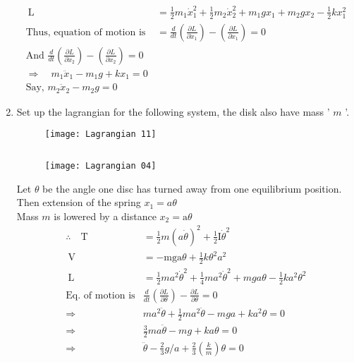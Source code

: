 \begin{enumerate}
\begin{answer}
\begin{align*}
	\mathrm{~L}&=\frac{1}{2} m_{1} \dot{x}_{1}^{2}+\frac{1}{2} m_{2} \dot{x}_{2}^{2}+m_{1} g x_{1}+m_{2} g x_{2}-\frac{1}{2} k x_{1}^{2}\\
	\text{Thus, equation of motion is }&=\frac{d}{d t}\left(\frac{\partial L}{\partial \dot{x}_{1}}\right)-\left(\frac{\partial L}{\partial x_{1}}\right)=0\\
	\text{And }\frac{d}{d t}\left(\frac{\partial L}{\partial \dot{x}_{2}}\right)-\left(\frac{\partial L}{\partial x_{2}}\right)=0\\
	\Rightarrow \quad m_{1} \ddot{x}_{1}-m_{1} g+k x_{1}=0\\
	\text{Say, }m_{2} \ddot{x}_{2}-m_{2} g=0
	\end{align*}
\end{answer}
\item Set up the lagrangian for the following system, the disk also have mass ' $m$ '.
\begin{figure}[H]
	\centering
	\texttt{[image: Lagrangian 11]}
\end{figure}
\begin{answer}$\left. \right. $
	\begin{figure}[H]
		\centering
		\texttt{[image: Lagrangian 04]}
	\end{figure}
		Let $\theta$ be the angle one disc has turned away from one equilibrium position. Then extension of the spring $x_{1}=a \theta$\\
	Mass $m$ is lowered by a distance $x_{2}=\mathrm{a} \theta$
	\begin{align*}
\therefore \quad \mathrm{T} &=\frac{1}{2} m(a \dot{\theta})^{2}+\frac{1}{2} \mathrm{I} \dot{\theta}^{2} \\ \mathrm{~V} &=-\mathrm{mga} \theta+\frac{1}{2} k \theta^{2} a^{2} \\ \mathrm{~L} &=\frac{1}{2} m a^{2} \dot{\theta}^{2}+\frac{1}{4} m a^{2} \dot{\theta}^{2}+m g a \theta-\frac{1}{2} k a^{2} \theta^{2} \\
\text{Eq. of motion is}&
\frac{d}{d t}\left(\frac{\partial L}{\partial \theta}\right)-\frac{\partial L}{\partial \theta}=0\\
\Rightarrow \quad &m a^{2} \ddot{\theta}+\frac{1}{2} m a^{2} \ddot{\theta}-m g a+k a^{2} \theta=0\\
\Rightarrow \quad &\frac{3}{2} m a \ddot{\theta}-m g+k a \theta=0\\
\Rightarrow \quad &\ddot{\theta}-\frac{2}{3} g / a+\frac{2}{3}\left(\frac{k}{m}\right) \theta=0
	\end{align*}

\end{answer}
\end{enumerate}
